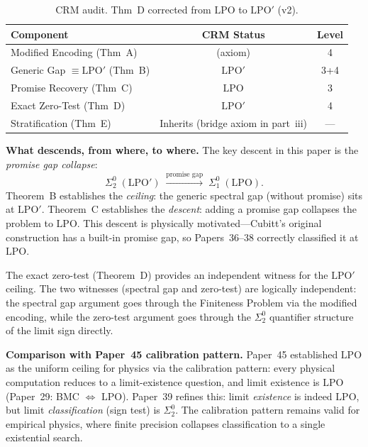 \documentclass[11pt,a4paper]{article}
\theoremstyle{plain}
\theoremstyle{definition}
\newcommand{\LPO}{\ensuremath{\mathrm{LPO}}}
\newcommand{\LPOj}{\ensuremath{\mathrm{LPO'}}}
\newcommand{\leanaxiom}{\textsf{\small \textcolor{orange!80!black}{(axiom)}}}
\begin{document}
\begin{table}[ht]
\centering
\begin{tabular}{@{}lcc@{}}
\toprule
\textbf{Component} & \textbf{CRM Status} & \textbf{Level} \\
\midrule
Modified Encoding (Thm~A) & \leanaxiom & 4 \\
Generic Gap $\equiv \LPOj$ (Thm~B) & $\LPOj$ & 3+4 \\
Promise Recovery (Thm~C) & $\LPO$ & 3 \\
Exact Zero-Test (Thm~D) & $\LPOj$ & 4 \\
Stratification (Thm~E) & Inherits (bridge axiom in part~iii) & --- \\
\bottomrule
\end{tabular}
\caption{CRM audit.  Thm~D corrected from $\LPO$ to $\LPOj$ (v2).}
\label{tab:audit}
\end{table}

\medskip\noindent
\textbf{What descends, from where, to where.}
The key descent in this paper is the \emph{promise gap collapse}:
\[
  \Sigma_2^0 \;(\LPOj)
  \;\xrightarrow{\text{promise gap}}\;
  \Sigma_1^0 \;(\LPO).
\]
Theorem~B establishes the \emph{ceiling}: the generic spectral gap
(without promise) sits at $\LPOj$.  Theorem~C establishes the
\emph{descent}: adding a promise gap collapses the problem to $\LPO$.
This descent is physically motivated---Cubitt's original construction
has a built-in promise gap, so Papers~36--38 correctly classified
it at $\LPO$.

The exact zero-test (Theorem~D) provides an independent witness
for the $\LPOj$ ceiling.  The two witnesses (spectral gap and
zero-test) are logically independent: the spectral gap argument
goes through the Finiteness Problem via the modified encoding,
while the zero-test argument goes through the $\Sigma_2^0$
quantifier structure of the limit sign directly.

\medskip\noindent
\textbf{Comparison with Paper~45 calibration pattern.}
Paper~45 established $\LPO$ as the uniform ceiling for physics
via the calibration pattern: every physical computation reduces
to a limit-existence question, and limit existence is $\LPO$
(Paper~29: BMC $\Leftrightarrow$ $\LPO$).  Paper~39 refines this:
limit \emph{existence} is indeed $\LPO$, but limit \emph{classification}
(sign test) is $\Sigma_2^0$.  The calibration pattern remains valid
for empirical physics, where finite precision collapses classification
to a single existential search.

\end{document}
